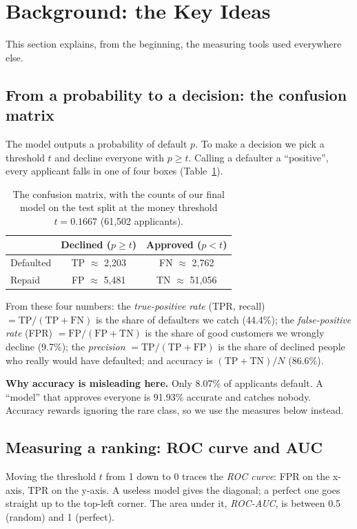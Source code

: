 \documentclass[conference,10pt]{IEEEtran}
\begin{document}
\section{Background: the Key Ideas}
\label{sec:background}
This section explains, from the beginning, the measuring tools used everywhere else.

\subsection{From a probability to a decision: the confusion matrix}
The model outputs a probability of default $p$. To make a decision we pick a threshold $t$ and
decline everyone with $p \ge t$. Calling a defaulter a ``positive'', every applicant falls in one
of four boxes (Table~\ref{tab:confusion}).

\begin{table}[h]
\centering\small
\caption{The confusion matrix, with the counts of our final model on the test split at the money threshold $t = 0.1667$ (61,502 applicants).}
\label{tab:confusion}
\begin{tabular}{@{}lcc@{}}
\toprule
 & Declined ($p \ge t$) & Approved ($p < t$) \\
\midrule
Defaulted & TP $\approx$ 2,203 & FN $\approx$ 2,762 \\
Repaid & FP $\approx$ 5,481 & TN $\approx$ 51,056 \\
\bottomrule
\end{tabular}
\end{table}

From these four numbers:
the \emph{true-positive rate} (TPR, recall) $= \mathrm{TP}/(\mathrm{TP}+\mathrm{FN})$ is the share
of defaulters we catch (44.4\%); the \emph{false-positive rate} (FPR) $= \mathrm{FP}/(\mathrm{FP}+\mathrm{TN})$
is the share of good customers we wrongly decline (9.7\%); the \emph{precision}
$= \mathrm{TP}/(\mathrm{TP}+\mathrm{FP})$ is the share of declined people who really would have
defaulted; and accuracy is $(\mathrm{TP}+\mathrm{TN})/N$ (86.6\%).

\textbf{Why accuracy is misleading here.} Only 8.07\% of applicants default. A ``model'' that
approves everyone is 91.93\% accurate and catches nobody. Accuracy rewards ignoring the rare
class, so we use the measures below instead.

\subsection{Measuring a ranking: ROC curve and AUC}
Moving the threshold $t$ from 1 down to 0 traces the \emph{ROC curve}: FPR on the x-axis, TPR on
the y-axis. A useless model gives the diagonal; a perfect one goes straight up to the top-left
corner. The area under it, \emph{ROC-AUC}, is between 0.5 (random) and 1 (perfect).
\end{document}

